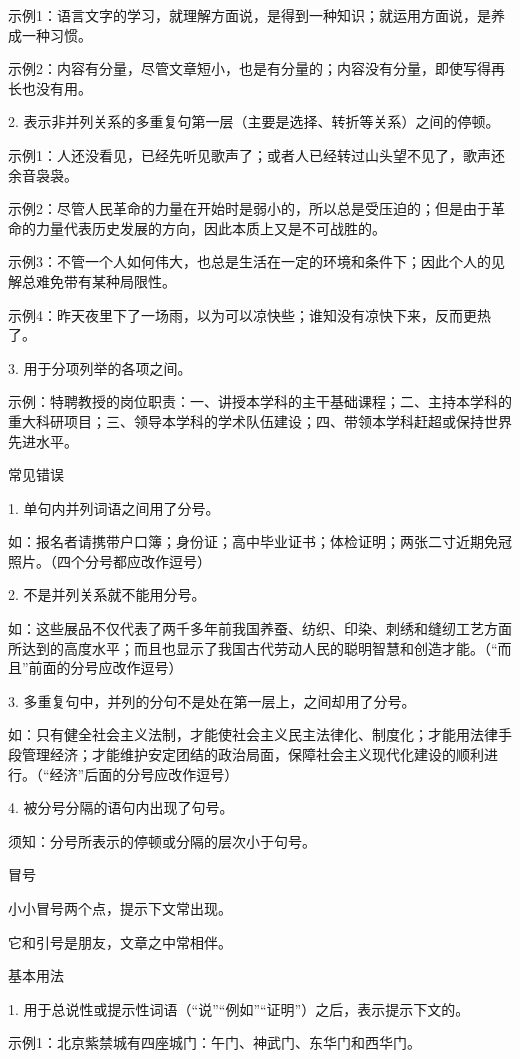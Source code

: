 示例1：语言文字的学习，就理解方面说，是得到一种知识；就运用方面说，是养成一种习惯。

示例2：内容有分量，尽管文章短小，也是有分量的；内容没有分量，即使写得再长也没有用。

2. 表示非并列关系的多重复句第一层（主要是选择、转折等关系）之间的停顿。

示例1：人还没看见，已经先听见歌声了；或者人已经转过山头望不见了，歌声还余音袅袅。

示例2：尽管人民革命的力量在开始时是弱小的，所以总是受压迫的；但是由于革命的力量代表历史发展的方向，因此本质上又是不可战胜的。

示例3：不管一个人如何伟大，也总是生活在一定的环境和条件下；因此个人的见解总难免带有某种局限性。

示例4：昨天夜里下了一场雨，以为可以凉快些；谁知没有凉快下来，反而更热了。

3. 用于分项列举的各项之间。

示例：特聘教授的岗位职责：一、讲授本学科的主干基础课程；二、主持本学科的重大科研项目；三、领导本学科的学术队伍建设；四、带领本学科赶超或保持世界先进水平。

常见错误

1. 单句内并列词语之间用了分号。

如：报名者请携带户口簿；身份证；高中毕业证书；体检证明；两张二寸近期免冠照片。（四个分号都应改作逗号）

2. 不是并列关系就不能用分号。

如：这些展品不仅代表了两千多年前我国养蚕、纺织、印染、刺绣和缝纫工艺方面所达到的高度水平；而且也显示了我国古代劳动人民的聪明智慧和创造才能。（“而且”前面的分号应改作逗号）

3. 多重复句中，并列的分句不是处在第一层上，之间却用了分号。

如：只有健全社会主义法制，才能使社会主义民主法律化、制度化；才能用法律手段管理经济；才能维护安定团结的政治局面，保障社会主义现代化建设的顺利进行。（“经济”后面的分号应改作逗号）

4. 被分号分隔的语句内出现了句号。

须知：分号所表示的停顿或分隔的层次小于句号。

冒号

小小冒号两个点，提示下文常出现。

它和引号是朋友，文章之中常相伴。

基本用法

1. 用于总说性或提示性词语（“说”“例如”“证明”）之后，表示提示下文的。

示例1：北京紫禁城有四座城门：午门、神武门、东华门和西华门。

